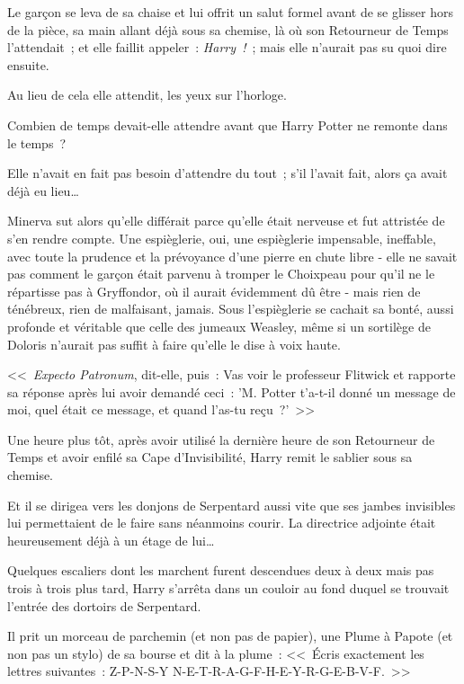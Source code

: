 Le garçon se leva de sa chaise et lui offrit un salut formel avant de se glisser hors de la pièce, sa main allant déjà sous sa chemise, là où son Retourneur de Temps l'attendait~; et elle faillit appeler~: \emph{Harry~!}~; mais elle n'aurait pas su quoi dire ensuite.

Au lieu de cela elle attendit, les yeux sur l'horloge.

Combien de temps devait-elle attendre avant que Harry Potter ne remonte dans le temps~?

Elle n'avait en fait pas besoin d'attendre du tout~; s'il l'avait fait, alors ça avait déjà eu lieu…

Minerva sut alors qu'elle différait parce qu'elle était nerveuse et fut attristée de s'en rendre compte. Une espièglerie, oui, une espièglerie impensable, ineffable, avec toute la prudence et la prévoyance d'une pierre en chute libre - elle ne savait pas comment le garçon était parvenu à tromper le Choixpeau pour qu'il ne le répartisse pas à Gryffondor, où il aurait évidemment dû être - mais rien de ténébreux, rien de malfaisant, jamais. Sous l'espièglerie se cachait sa bonté, aussi profonde et véritable que celle des jumeaux Weasley, même si un sortilège de Doloris n'aurait pas suffit à faire qu'elle le dise à voix haute.

<<~\emph{Expecto Patronum}, dit-elle, puis~: Vas voir le professeur Flitwick et rapporte sa réponse après lui avoir demandé ceci~: 'M. Potter t'a-t-il donné un message de moi, quel était ce message, et quand l'as-tu reçu~?'~>>

\later

Une heure plus tôt, après avoir utilisé la dernière heure de son Retourneur de Temps et avoir enfilé sa Cape d'Invisibilité, Harry remit le sablier sous sa chemise.

Et il se dirigea vers les donjons de Serpentard aussi vite que ses jambes invisibles lui permettaient de le faire sans néanmoins courir. La directrice adjointe était heureusement déjà à un étage de lui…

Quelques escaliers dont les marchent furent descendues deux à deux mais pas trois à trois plus tard, Harry s'arrêta dans un couloir au fond duquel se trouvait l'entrée des dortoirs de Serpentard.

Il prit un morceau de parchemin (et non pas de papier), une Plume à Papote (et non pas un stylo) de sa bourse et dit à la plume~: <<~Écris exactement les lettres suivantes~: Z-P-N-S-Y N-E-T-R-A-G-F-H-E-Y-R-G-E-B-V-F.~>>

